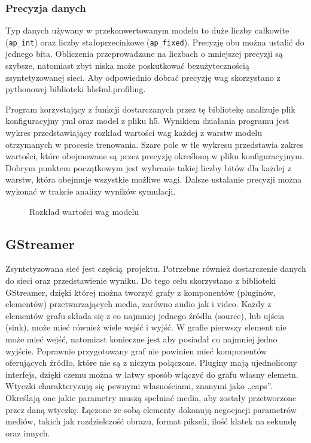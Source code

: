 \documentclass[12pt, oneside]{article}
\begin{document}
\subsubsection{Precyzja danych}
Typ danych używany w przekonwertowanym modelu to duże liczby całkowite
(\lstinline{ap_int}) oraz liczby stałoprzecinkowe (\lstinline{ap_fixed}).
Precyzję obu można ustalić do jednego bita.
Obliczenia przeprowadzane na liczbach o mniejszej
precyzji są szybsze, natomiast zbyt niska może poskutkować
bezużytecznością zsyntetyzowanej sieci. Aby odpowiednio dobrać precyzję
wag skorzystano z pythonowej biblioteki hls4ml.profiling.

Program korzystający z funkcji dostarczanych przez tę bibliotekę
analizuje plik konfiguracyjny yml oraz model z pliku h5.
Wynikiem działania programu jest wykres przedstawiający
rozkład wartości wag każdej z warstw modelu otrzymanych w procesie trenowania.
Szare pole w tle wykresu
przedstawia zakres wartości, które obejmowane są przez precyzję określoną
w pliku konfiguracyjnym. Dobrym punktem początkowym jest wybranie takiej
liczby bitów dla każdej z warstw, która obejmuje wszystkie możliwe wagi.
Dalsze ustalanie precyzji można wykonać w trakcie analizy wyników
symulacji.
\begin{figure}[h]
  \caption{Rozkład wartości wag modelu}\label{fig:weights_dist}
  
  \centering
\end{figure}


\subsection{GStreamer}
Zsyntetyzowana sieć jest częścią projektu. Potrzebne również dostarczenie
danych do sieci oraz przedstawienie wyniku.
Do tego celu skorzystano z biblioteki GStreamer, dzięki której można
tworzyć grafy z komponentów (pluginów, elementów)
przetwarzających media, zarówno audio jak i video.
Każdy z elementów grafu składa się z co najmniej jednego źródła (source),
lub ujścia (sink), może mieć również wiele wejść i wyjść. W grafie pierwszy
element nie może mieć wejść, natomiast konieczne jest aby posiadał co najmniej
jedno wyjście. Poprawnie przygotowany graf nie powinien mieć komponentów
oferujących źródło, które nie są z niczym połączone.
Pluginy mają ujednolicony interfejs, dzięki czemu można w łatwy sposób
włączyć do grafu własny elemetn. Wtyczki charakteryzują się
pewnymi własnościami, znanymi jako „caps”. Określają one jakie parametry
muszą spełniać media, aby zostały przetworzone przez daną wtyczkę.
Łączone ze sobą elementy dokonują negocjacji
parametrów mediów, takich jak rozdzielczość obrazu, format pikseli,
ilość klatek na sekundę oraz innych.
\end{document}
